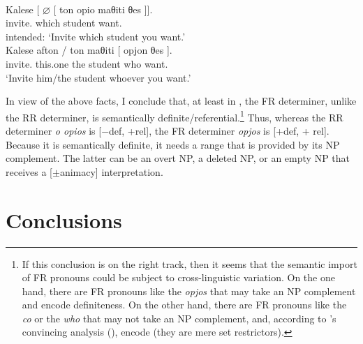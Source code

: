 \documentclass[output=paper]{langsci/langscibook}
\begin{document}
\ea {}\label{ex:01.30}\\
    \gll    \llap{*}Kalese [ ${\varnothing}$ [ {ton opio} maθiti θes ]].\\
            invite.\Ssg{} {} {} {} which student want.\Ssg{}\\
    \trans intended: \enquote*{Invite which student you want.}
\ex {}\label{ex:01.31}\\
    \gll    \llap{*}Kalese afton / ton maθiti [ opjon θes ].\\
            invite.\Ssg{} this.one {} the student {} who want.\Ssg{}\\
    \trans  *\enquote*{Invite him/the student whoever you want.}
\z

In view of the above facts, I conclude that, at least in , the
\gls{FR} determiner, unlike the \gls{RR} determiner, is semantically
definite/referential.\footnote{ If this conclusion is on the right track, then
    it seems that the semantic import of \gls{FR} pronouns could be subject to
    cross-linguistic variation. On the one hand, there are \gls{FR} pronouns
    like the  \emph{opjos} that may take an NP complement and encode
    definiteness. On the other hand, there are \gls{FR} pronouns like the
     \emph{co} or the  \emph{who} that may not take an NP
    complement, and, according to \citeauthor{Caponigro2003}’s convincing
    analysis (\citeyear{Caponigro2003}),
    encode  (they are mere set restrictors).} Thus, whereas the \gls{RR}
    determiner \emph{o opios} is [−def, +rel], the \gls{FR} determiner
    \emph{opjos} is [+def, + rel]. Because it is semantically definite, it
    needs a range that is provided by its NP complement. The latter can be an
    overt NP, a deleted NP, or an empty NP that receives a [$\pm$animacy]
    interpretation.

\section{Conclusions}\label{sec:01.5}\largerpage
\end{document}
